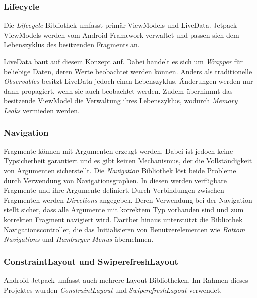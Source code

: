\subsubsection{Lifecycle}
\label{subsubsec:app:jetpack:lifecycle}
Die \textit{Lifecycle} Bibliothek umfasst primär ViewModels und LiveData.
Jetpack ViewModels werden vom Android Framework verwaltet und passen sich dem Lebenszyklus des besitzenden Fragments an.

LiveData baut auf diesem Konzept auf.
Dabei handelt es sich um \textit{Wrapper} für beliebige Daten, deren Werte beobachtet werden können.
Anders als traditionelle \textit{Observables} besitzt LiveData jedoch einen Lebenszyklus.
Änderungen werden nur dann propagiert, wenn sie auch beobachtet werden.
Zudem übernimmt das besitzende ViewModel die Verwaltung ihres Lebenszyklus, wodurch \textit{Memory Leaks} vermieden werden.

\subsubsection{Navigation}
\label{subsubsec:app:jetpack:navigation}
Fragmente können mit Argumenten erzeugt werden.
Dabei ist jedoch keine Typsicherheit garantiert und es gibt keinen Mechanismus, der die Vollständigkeit von Argumenten sicherstellt.
Die \textit{Navigation} Bibliothek löst beide Probleme durch Verwendung von Navigationsgraphen.
In diesen werden verfügbare Fragmente und ihre Argumente definiert.
Durch Verbindungen zwischen Fragmenten werden \textit{Directions} angegeben.
Deren Verwendung bei der Navigation stellt sicher, dass alle Argumente mit korrektem Typ vorhanden sind und zum korrekten Fragment navigiert wird.
Darüber hinaus unterstützt die Bibliothek Navigationscontroller, die das Initialisieren von Benutzerelementen wie \textit{Bottom Navigations} und \textit{Hamburger Menus} übernehmen. 

\subsubsection{ConstraintLayout und SwiperefreshLayout}
\label{subsubsec:app:jetpack:layouts}
Android Jetpack umfasst auch mehrere Layout Bibliotheken.
Im Rahmen dieses Projektes wurden \textit{ConstraintLayout} und \textit{SwiperefreshLayout} verwendet.

